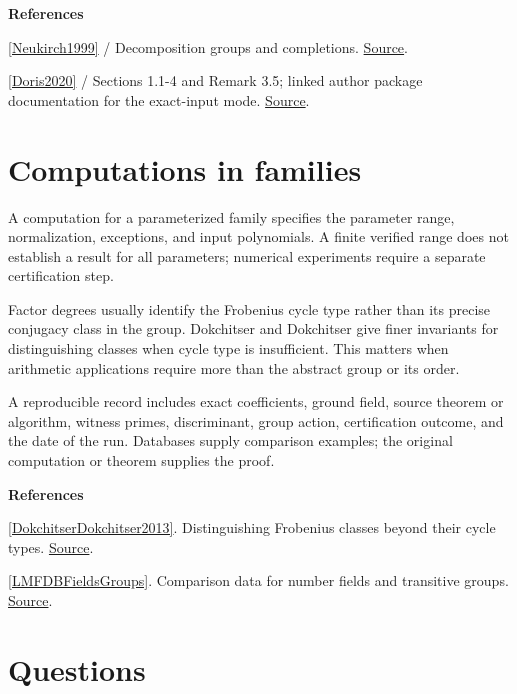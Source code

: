 \documentclass[11pt,a4paper,oneside,openany]{book}
\newenvironment{sources}{\par\smallskip\begingroup\footnotesize\color{atlasgray}\leftskip=10pt\setlength{\parskip}{2pt}}{\par\endgroup\smallskip}
\begin{document}
\begin{sources}
\textbf{References}\par\smallskip
\noindent\hyperlink{ref:Neukirch1999}{[Neukirch1999]} / Decomposition groups and completions.  \href{https://link.springer.com/book/10.1007/978-3-662-03983-0}{Source}.\par
\noindent\hyperlink{ref:Doris2020}{[Doris2020]} / Sections 1.1-4 and Remark 3.5; linked author package documentation for the exact-input mode.  \href{https://arxiv.org/abs/2003.05834}{Source}.\par
\end{sources}\color{black}
\section{Computations in families}
\color{black} A computation for a parameterized family specifies the parameter range, normalization, exceptions, and input polynomials. A finite verified range does not establish a result for all parameters; numerical experiments require a separate certification step.\par
\color{black} Factor degrees usually identify the Frobenius cycle type rather than its precise conjugacy class in the group. Dokchitser and Dokchitser give finer invariants for distinguishing classes when cycle type is insufficient. This matters when arithmetic applications require more than the abstract group or its order.\par
\color{black} A reproducible record includes exact coefficients, ground field, source theorem or algorithm, witness primes, discriminant, group action, certification outcome, and the date of the run. Databases supply comparison examples; the original computation or theorem supplies the proof.\par
\begin{sources}
\textbf{References}\par\smallskip
\noindent\hyperlink{ref:DokchitserDokchitser2013}{[DokchitserDokchitser2013]}. Distinguishing Frobenius classes beyond their cycle types. \href{https://doi.org/10.2140/ant.2013.7.1325}{Source}.\par
\noindent\hyperlink{ref:LMFDBFieldsGroups}{[LMFDBFieldsGroups]}. Comparison data for number fields and transitive groups. \href{https://www.lmfdb.org/NumberField/}{Source}.\par
\end{sources}\color{black}
\section*{Questions}
\end{document}
